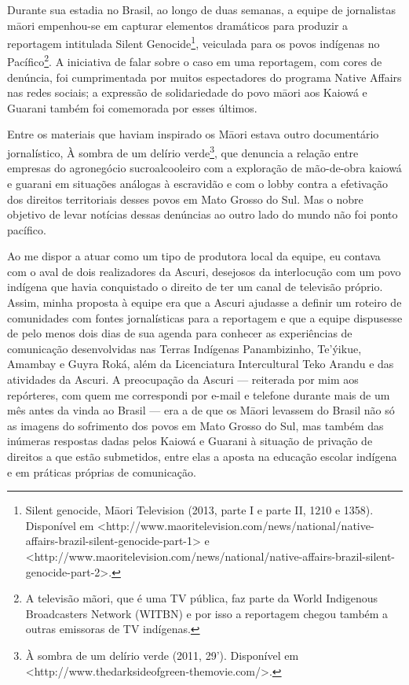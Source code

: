\documentclass{article}
\begin{document}
Durante sua estadia no Brasil, ao longo de duas semanas, a equipe de
jornalistas m\=aori empenhou-se em capturar elementos dram\'aticos para
produzir a reportagem intitulada Silent Genocide\footnote{ Silent
genocide, M\=aori Television (2013, parte I e parte II,
12{\textquotesingle}10{\textquotesingle}{\textquotesingle} e
13{\textquotesingle}58{\textquotesingle}{\textquotesingle}).
Dispon\'ivel em
{\textless}http://www.maoritelevision.com/news/national/native-affairs-brazil-silent-genocide-part-1{\textgreater}
e
{\textless}http://www.maoritelevision.com/news/national/native-affairs-brazil-silent-genocide-part-2{\textgreater}.},
veiculada para os povos ind\'igenas no Pac\'ifico\footnote{ A
televis\~ao m\~aori, que \'e uma TV p\'ublica, faz parte da World
Indigenous Broadcasters Network (WITBN) e por isso a reportagem chegou
tamb\'em a outras emissoras de TV ind\'igenas. }. A iniciativa de falar
sobre o caso em uma reportagem, com cores de den\'uncia, foi
cumprimentada por muitos espectadores do programa Native Affairs nas
redes sociais; a express\~ao de solidariedade do povo m\=aori aos
Kaiow\'a e Guarani tamb\'em foi comemorada por esses \'ultimos.

Entre os materiais que haviam inspirado os M\=aori estava outro
document\'ario jornal\'istico, \`A sombra de um del\'irio
verde\footnote{ \`A sombra de um del\'irio verde (2011,
29{\textquoteright}). Dispon\'ivel em
{\textless}http://www.thedarksideofgreen-themovie.com/{\textgreater}.},
que denuncia a rela\c{c}\~ao entre empresas do agroneg\'ocio
sucroalcooleiro com a explora\c{c}\~ao de m\~ao-de-obra kaiow\'a e
guarani em situa\c{c}\~oes an\'alogas \`a escravid\~ao e com o lobby
contra a efetiva\c{c}\~ao dos direitos territoriais desses povos em
Mato Grosso do Sul. Mas o nobre objetivo de levar not\'icias dessas
den\'uncias ao outro lado do mundo n\~ao foi ponto pac\'ifico.

Ao me dispor a atuar como um tipo de produtora local da equipe, eu
contava com o aval de dois realizadores da Ascuri, desejosos da
interlocu\c{c}\~ao com um povo ind\'igena que havia conquistado o
direito de ter um canal de televis\~ao pr\'oprio. Assim, minha proposta
\`a equipe era que a Ascuri ajudasse a definir um roteiro de
comunidades com fontes jornal\'isticas para a reportagem e que a equipe
dispusesse de pelo menos dois dias de sua agenda para conhecer as
experi\^encias de comunica\c{c}\~ao desenvolvidas nas Terras
Ind\'igenas Panambizinho, Te{\textquoteright}\'yikue, Amambay e Guyra
Rok\'a, al\'em da Licenciatura Intercultural Teko Arandu e das
atividades da Ascuri. A preocupa\c{c}\~ao da Ascuri --- reiterada por
mim aos rep\'orteres, com quem me correspondi por e-mail e telefone
durante mais de um m\^es antes da vinda ao Brasil --- era a de que os
M\=aori levassem do Brasil n\~ao s\'o as imagens do sofrimento dos
povos em Mato Grosso do Sul, mas tamb\'em das in\'umeras respostas
dadas pelos Kaiow\'a e Guarani \`a situa\c{c}\~ao de priva\c{c}\~ao de
direitos a que est\~ao submetidos, entre elas a aposta na
educa\c{c}\~ao escolar ind\'igena e em pr\'aticas pr\'oprias de
comunica\c{c}\~ao. 
\end{document}
